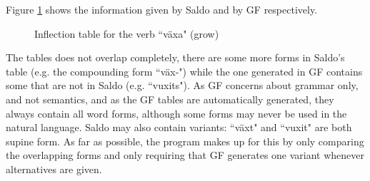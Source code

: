 \documentclass{report}
\begin{document}
Figure \ref{pic:TabVax} shows the information given by Saldo and by GF respectively.\\
\begin{figure}[h]
  \begin{center}
\hspace{5mm}
\caption{Inflection table for the verb ``växa" (grow)}
\label{pic:TabVax}
  \end{center}
\end{figure}
The tables does not overlap completely, there are some more forms in Saldo's table (e.g. the 
compounding form ``väx-")
while the one generated in GF contains some that are not in Saldo (e.g. ``vuxits").
As GF concerns about grammar only, and not semantics, and  as the GF tables are automatically
generated, they always contain all word forms, although some forms may never be
used in the natural language.
Saldo may also contain variants: ``växt" and ``vuxit" are both supine form.
As far as possible, the program makes up for this by only comparing the overlapping forms
and only requiring that GF generates one variant whenever alternatives are given. \\
\end{document}
